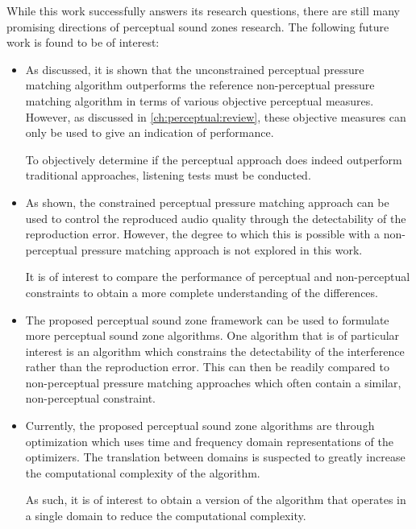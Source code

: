 While this work successfully answers its research questions, 
there are still many promising directions of perceptual sound zones research.
The following future work is found to be of interest:
\begin{itemize}
    \item As discussed, it is shown that the unconstrained perceptual pressure matching algorithm outperforms 
        the reference non-perceptual pressure matching algorithm in terms of various objective perceptual measures.
        However, as discussed in \autoref{ch:perceptual:review}, 
        these objective measures can only be used to give an indication of performance.

        To objectively determine if the perceptual approach does indeed outperform traditional approaches, 
        listening tests must be conducted.

    \item As shown, the constrained perceptual pressure matching approach can be used to control the 
        reproduced audio quality through the detectability of the reproduction error.
        However, the degree to which this is possible with a non-perceptual pressure matching approach
        is not explored in this work.

        It is of interest to compare the performance of perceptual and non-perceptual constraints to 
        obtain a more complete understanding of the differences.

    \item The proposed perceptual sound zone framework can be used to formulate more perceptual sound zone 
        algorithms.
        One algorithm that is of particular interest is an algorithm which constrains the detectability of 
        the interference rather than the reproduction error. 
        This can then be readily compared to non-perceptual pressure matching approaches which often 
        contain a similar, non-perceptual constraint.

    \item Currently, the proposed perceptual sound zone algorithms are through optimization which uses 
        time and frequency domain representations of the optimizers.
        The translation between domains is suspected to greatly increase the computational complexity of the algorithm.

        As such, it is of interest to obtain a version of the algorithm that operates in a single domain to reduce 
        the computational complexity. 
\end{itemize}

